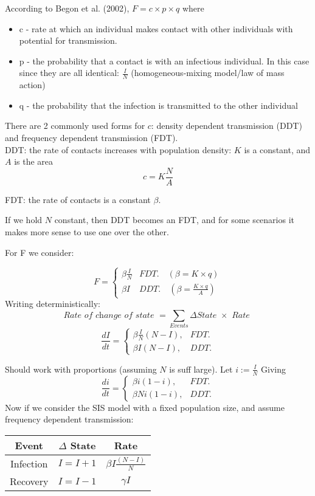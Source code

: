 \documentclass{/home/janmebows/Documents/LatexTemplates/myassignment}
\begin{document}
According to Begon et al. (2002), $F = c\times p \times q$ where 
\begin{itemize}
    \item c - rate at which an individual makes contact with other individuals with potential for transmission. 
    \item p - the probability that a contact is with an infectious individual. In this case since they are all identical: $\frac{I}{N}$ (homogeneous-mixing model/law of mass action)
    \item q - the probability that the infection is transmitted to the other individual
\end{itemize}
There are 2 commonly used forms for $c$: density dependent transmission (DDT) and frequency dependent transmission (FDT).\\
DDT: the rate of contacts increases with population density: $K$ is a constant, and $A$ is the area
\[c = K\frac{N}{A}\]

FDT: the rate of contacts is a constant $\beta$.

If we hold $N$ constant, then DDT becomes an FDT, and for some scenarios it makes more sense to use one over the other.

For F we consider:

\[F= \begin{cases}
\beta \frac{I}{N}&FDT. \quad (\beta = K\times q)\\
\beta I& DDT.\quad (\beta = \frac{K\times q}{A})
\end{cases}\]
Writing deterministically:\
\[\textit{Rate of change of state }= \sum_{Events}\Delta\textit{State }\times \textit{ Rate }\] 
\[\frac{dI}{dt} = \begin{cases}
\beta \frac{I}{N}(N-I),&FDT.\\
\beta I(N-I),&DDT.
\end{cases}\]

Should work with proportions (assuming $N$ is suff large).
Let $i := \frac IN$
Giving
\[\frac{di}{dt} = \begin{cases}
\beta i(1-i),&FDT.\\
\beta Ni(1-i),&DDT.
\end{cases}\]
\newpage
Now if we consider the SIS model with a fixed population size, and assume frequency dependent transmission:
\begin{table}[h]
    \centering
    \begin{tabular}{c|c|c}
         Event&$\Delta$ State&Rate \\
         \hline
         Infection&$I=I+1$&$\beta I\frac{(N-I)}{N}$\\
         Recovery &$I=I-1$&$\gamma I$
    \end{tabular}
\end{table}
\end{document}
